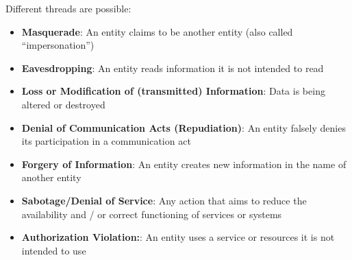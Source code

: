 Different threads are possible:
\begin{itemize}[noitemsep, topsep=0pt]
  \item \textbf{Masquerade}: An entity claims to be another entity (also called ``impersonation'')
  \item \textbf{Eavesdropping}: An entity reads information it is not intended to read
  \item \textbf{Loss or Modification of (transmitted) Information}: Data is being altered or destroyed
  \item \textbf{Denial of Communication Acts (Repudiation)}: An entity falsely denies its participation in a communication act
  \item \textbf{Forgery of Information}: An entity creates new information in the name of another entity
  \item \textbf{Sabotage/Denial of Service}: Any action that aims to reduce the availability and / or correct functioning of services or systems
  \item \textbf{Authorization Violation:}: An entity uses a service or resources it is not intended to use
\end{itemize}
